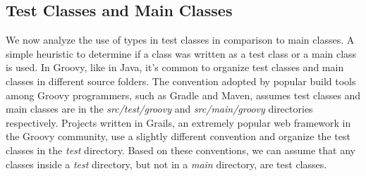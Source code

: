 \documentclass[preprint]{sigplanconf}
\begin{document}
\subsection{Test Classes and Main Classes\label{sec:results-tests}}
We now analyze the use of types in test classes in comparison to main classes.
A simple heuristic to determine if a class was written as a test class or a main class is used.
In Groovy, like in Java, it's common to organize test classes and main classes in different source folders.
The convention adopted by popular build tools among Groovy programmers, such as Gradle and Maven, assumes test classes and main classes are in the \emph{src/test/groovy} and \emph{src/main/groovy} directories respectively.
Projects written in Grails, an extremely popular web framework in the Groovy community, use a slightly different convention and organize the test classes in the \emph{test} directory.
Based on these conventions, we can assume that any classes inside a \emph{test} directory, but not in a \emph{main} directory, are test classes.
\end{document}

